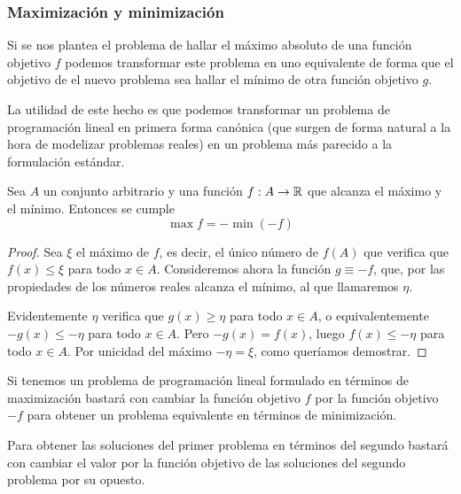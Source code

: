 \subsubsection{Maximización y minimización}
Si se nos plantea el problema de hallar el máximo absoluto de una función objetivo $f$ podemos transformar este problema en uno equivalente de forma que el objetivo de el nuevo problema sea hallar el mínimo de otra función objetivo $g$.

La utilidad de este hecho es que podemos transformar un problema de programación lineal en primera forma canónica (que surgen de forma natural a la hora de modelizar problemas reales) en un problema más parecido a la formulación estándar.
\begin{lem}
	\label{fund_lem_maxmin}
	Sea $A$ un conjunto arbitrario y una función $f:A\to\mathbb{R}$ que alcanza el máximo y el mínimo. Entonces se cumple
	\begin{equation*}
		\max f=-\min (-f)
	\end{equation*}
\end{lem}
\begin{proof}
	Sea $\xi$ el máximo de $f$, es decir, el único número de $f(A)$ que verifica que $f(x)\leq \xi$ para todo $x\in A$. Consideremos ahora la función $g\equiv -f$, que, por las propiedades de los números reales alcanza el mínimo, al que llamaremos $\eta$.
	
	Evidentemente $\eta$ verifica que $g(x)\geq \eta$ para todo $x\in A$, o equivalentemente $-g(x)\leq -\eta$ para todo $x\in A$. Pero $-g(x)=f(x)$, luego $f(x)\leq -\eta$ para todo $x\in A$. Por unicidad del máximo $-\eta =\xi$, como queríamos demostrar.
\end{proof}
\begin{obs}[Aplicación]
	Si tenemos un problema de programación lineal formulado en términos de maximización bastará con cambiar la función objetivo $f$ por la función objetivo $-f$ para obtener un problema equivalente en términos de minimización.
	
	Para obtener las soluciones del primer problema en términos del segundo bastará con cambiar el valor por la función objetivo de las soluciones del segundo problema por su opuesto.
\end{obs}
